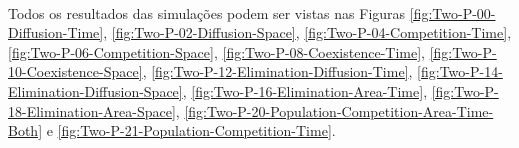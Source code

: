 \documentclass{article}
\begin{document}
	\paragraph{}
	Todos os resultados das simulações podem ser vistas nas Figuras \ref{fig:Two-P-00-Diffusion-Time}, \ref{fig:Two-P-02-Diffusion-Space}, \ref{fig:Two-P-04-Competition-Time}, \ref{fig:Two-P-06-Competition-Space}, \ref{fig:Two-P-08-Coexistence-Time}, \ref{fig:Two-P-10-Coexistence-Space}, \ref{fig:Two-P-12-Elimination-Diffusion-Time}, \ref{fig:Two-P-14-Elimination-Diffusion-Space}, \ref{fig:Two-P-16-Elimination-Area-Time}, \ref{fig:Two-P-18-Elimination-Area-Space}, \ref{fig:Two-P-20-Population-Competition-Area-Time-Both} e \ref{fig:Two-P-21-Population-Competition-Time}.
	
	\begin{figure}[h]
		\centering
		\qquad

\end{figure}
\end{document}
